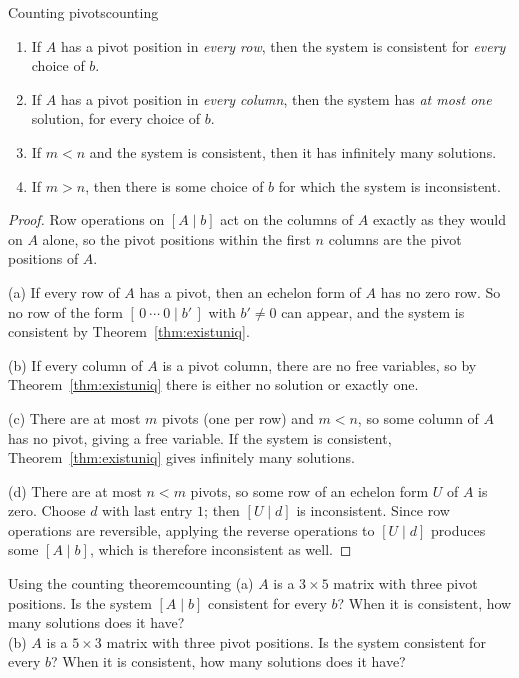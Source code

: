 \documentclass[11pt]{article}
\begin{document}
\begin{thm}{Counting pivots}{counting}
\begin{enumerate}[label=(\alph*),itemsep=2pt]
  \item If $A$ has a pivot position in \emph{every row}, then the system is consistent for \emph{every} choice of $b$.
  \item If $A$ has a pivot position in \emph{every column}, then the system has \emph{at most one} solution,
        for every choice of $b$.
  \item If $m<n$ and the system is consistent, then it has infinitely many solutions.
  \item If $m>n$, then there is some choice of $b$ for which the system is inconsistent.
\end{enumerate}
\end{thm}
 
\begin{proof}
Row operations on $[A\mid b]$ act on the columns of $A$ exactly as they would on $A$ alone, so the pivot positions
within the first $n$ columns are the pivot positions of $A$.
 
(a) If every row of $A$ has a pivot, then an echelon form of $A$ has no zero row. So no row of the form
$[\,0\ \cdots\ 0\mid b'\,]$ with $b'\ne0$ can appear, and the system is consistent by
Theorem~\ref{thm:existuniq}.
 
(b) If every column of $A$ is a pivot column, there are no free variables, so by Theorem~\ref{thm:existuniq} there is
either no solution or exactly one.
 
(c) There are at most $m$ pivots (one per row) and $m<n$, so some column of $A$ has no pivot, giving a free variable.
If the system is consistent, Theorem~\ref{thm:existuniq} gives infinitely many solutions.
 
(d) There are at most $n<m$ pivots, so some row of an echelon form $U$ of $A$ is zero. Choose $d$ with last entry $1$;
then $[U\mid d]$ is inconsistent. Since row operations are reversible, applying the reverse operations to $[U\mid d]$
produces some $[A\mid b]$, which is therefore inconsistent as well.
\end{proof}
 
\begin{kc}{Using the counting theorem}{counting}
(a) $A$ is a $3\times5$ matrix with three pivot positions. Is the system $[A\mid b]$ consistent for every $b$?
When it is consistent, how many solutions does it have?\\
(b) $A$ is a $5\times3$ matrix with three pivot positions. Is the system consistent for every $b$? When it is
consistent, how many solutions does it have?
\end{kc}
 
\end{document}
